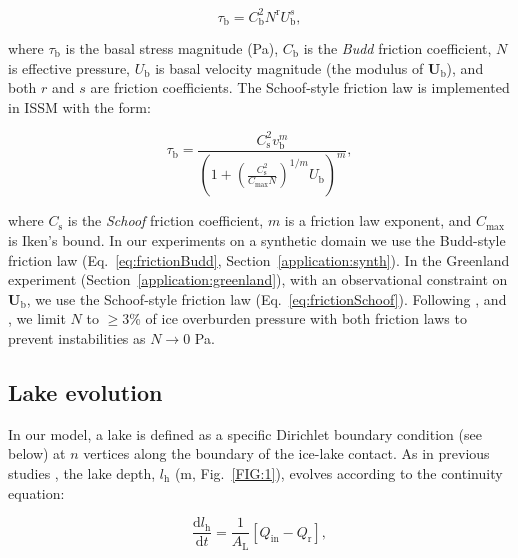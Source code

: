 \documentclass[tc, manuscript]{copernicus}
\begin{document}
\begin{equation}
\label{eq:frictionBudd}
\tau_{\mathrm{b}} = C^{2}_{\mathrm{b}} N^{\mathrm{r}} U_{\mathrm{b}}^{s} ,
\end{equation}

\noindent
where $\tau_{\mathrm{b}}$ is the basal stress magnitude (Pa), $C_{\mathrm{b}}$ is the \textit{Budd} friction coefficient, $N$ is effective pressure, $U_{\mathrm{b}}$ is basal velocity magnitude (the modulus of $\mathbf{U}_{\mathrm{b}}$), and both $r$ and $s$ are friction coefficients. The Schoof-style friction law is implemented in ISSM with the form: 

\begin{equation}
\label{eq:frictionSchoof}
\tau_{\mathrm{b}}=\frac{C_{\mathrm{s}}^2 v_{\mathrm{b}}^m}{\left(1+\left(\frac{C_{\mathrm{s}}^2}{C_{\max } N}\right)^{1 / m} U_{\mathrm{b}}\right)^m},
\end{equation}

\noindent
where $C_{\mathrm{s}}$ is the \textit{Schoof} friction coefficient, $m$ is a friction law exponent, and $C_{\mathrm{max}}$ is Iken's bound. In our experiments on a synthetic domain we use the Budd-style friction law (Eq.~\ref{eq:frictionBudd}, Section~\ref{application:synth}). In the Greenland experiment (Section~\ref{application:greenland}), with an observational constraint on $\mathbf{U}_{\mathrm{b}}$, we use the Schoof-style friction law (Eq.~\ref{eq:frictionSchoof}). Following \citet{mcarthur2023basal}, and \citet{ehrenfeucht2023seasonal}, we limit $N$ to $\geq$3\% of ice overburden pressure with both friction laws to prevent instabilities as $N \to 0$ Pa. 

\subsection{Lake evolution}\label{methods:Lake}

In our model, a lake is defined as a specific Dirichlet boundary condition (see below)  at $n$ vertices along the boundary of the ice-lake contact. As in previous studies \citep[e.g.,][]{kingslake2013modelling}, the lake depth, $l_{\mathrm{h}}$ ($\mathrm{m}$, Fig.~\ref{FIG:1}), evolves according to the continuity equation:

\begin{equation}
\label{eq:lakecontinuity}
\frac{\mathrm{d} l_{\mathrm{h}}}{\mathrm{d} t} = \frac{1}{A_{\mathrm{L}}}[Q_{\mathrm{in}}-Q_{\mathrm{r}}],
\end{equation}
\end{document}

